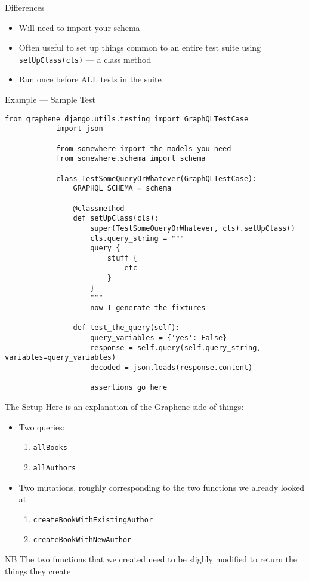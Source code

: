 \documentclass[t]{beamer}
\newcommand{\code}[1]{\texttt{#1}}
\begin{document}
	\begin{frame}{Differences}
		\begin{itemize}
			\item Will need to import your schema
			\item Often useful to set up things common to an entire test suite using \code{setUpClass(cls)} --- a class method
			\item Run once before ALL tests in the suite
		\end{itemize}
	\end{frame}

	\begin{frame}{Example --- Sample Test}
		\begin{lstlisting}[style = python, autogobble]
			from graphene_django.utils.testing import GraphQLTestCase
			import json

			from somewhere import the models you need
			from somewhere.schema import schema

			class TestSomeQueryOrWhatever(GraphQLTestCase):
				GRAPHQL_SCHEMA = schema

				@classmethod
				def setUpClass(cls):
					super(TestSomeQueryOrWhatever, cls).setUpClass()
					cls.query_string = """
					query {
						stuff {
							etc
						}
					}
					"""
					now I generate the fixtures

				def test_the_query(self):
					query_variables = {'yes': False}
					response = self.query(self.query_string, variables=query_variables)
					decoded = json.loads(response.content)

					assertions go here
		\end{lstlisting}
	\end{frame}

	\begin{frame}{The Setup}
		Here is an explanation of the Graphene side of things:
		\begin{itemize}
			\item Two queries:
				\begin{enumerate}
					\item \code{allBooks}
					\item \code{allAuthors}
				\end{enumerate}
			\item Two mutations, roughly corresponding to the two functions we already looked at
				\begin{enumerate}
					\item \code{createBookWithExistingAuthor}
					\item \code{createBookWithNewAuthor}
				\end{enumerate}
		\end{itemize}
		NB The two functions that we created need to be slighly modified to return the things they create
	\end{frame}
\end{document}
